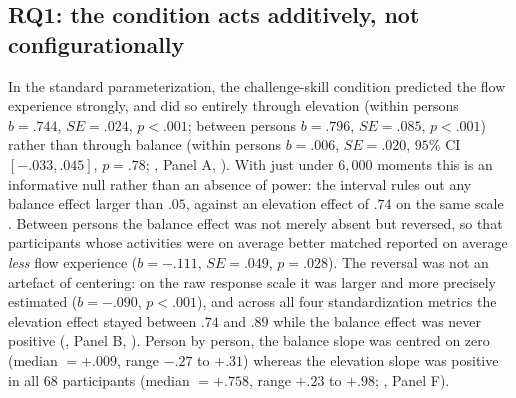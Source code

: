 \documentclass[11pt,a4paper]{article}
\begin{document}
\subsection{RQ1: the condition acts additively, not configurationally}
In the standard parameterization, the challenge-skill condition predicted the flow experience
strongly, and did so entirely through elevation (within persons $b=.744$, $SE=.024$, $p<.001$;
between persons $b=.796$, $SE=.085$, $p<.001$) rather than through balance (within persons
$b=.006$, $SE=.020$, $95\%$ CI $[-.033, .045]$, $p=.78$; , Panel A,
). With just under $6{,}000$ moments this is an informative null rather than an
absence of power: the interval rules out any balance effect larger than $.05$, against an elevation
effect of $.74$ on the same scale \citep{lakens2018equivalence}. Between persons the balance effect
was not merely absent but reversed, so that participants whose activities were on average better
matched reported on average \emph{less} flow experience ($b=-.111$, $SE=.049$, $p=.028$). The
reversal was not an artefact of centering: on the raw response scale it was larger and more
precisely estimated ($b=-.090$, $p<.001$), and across all four standardization metrics the
elevation effect stayed between $.74$ and $.89$ while the balance effect was never positive
(, Panel B, ). Person by person, the balance
slope was centred on zero (median $=+.009$, range $-.27$ to $+.31$) whereas the elevation slope was
positive in all 68 participants (median $=+.758$, range $+.23$ to $+.98$; ,
Panel F).
\end{document}
